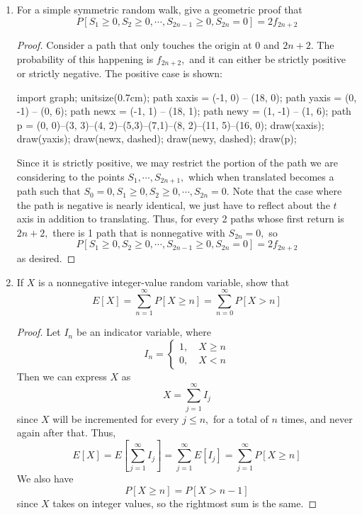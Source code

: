 \documentclass{article}
\begin{document}
\begin{enumerate}
	\item For a simple symmetric random walk, give a geometric proof that 
		\[P[S_1\ge 0, S_2\ge 0, \cdots, S_{2n-1}\ge 0, S_{2n}=0] = 2f_{2n+2}\]
		\begin{proof}
			Consider a path that only touches the origin at 0 and $2n+2.$ The probability of this happening is $f_{2n+2},$ and it can either be strictly positive or strictly negative. The positive case is shown:
			\begin{center}
				\begin{asy}
					import graph;
					unitsize(0.7cm);
					path xaxis = (-1, 0) -- (18, 0);
					path yaxis = (0, -1) -- (0, 6);
					path newx = (-1, 1) -- (18, 1);
					path newy = (1, -1) -- (1, 6);
					path p = (0, 0)--(3, 3)--(4, 2)--(5,3)--(7,1)--(8, 2)--(11, 5)--(16, 0);
					draw(xaxis);
					draw(yaxis);
					draw(newx, dashed);
					draw(newy, dashed);
					draw(p);
				\end{asy}
			\end{center}
			Since it is strictly positive, we may restrict the portion of the path we are considering to the points $S_1, \cdots, S_{2n+1},$ which when translated becomes a path such that $S_0= 0, S_1\ge 0, S_2\ge 0, \cdots, S_{2n}=0.$ Note that the case where the path is negative is nearly identical, we just have to reflect about the $t$ axis in addition to translating. Thus, for every 2 paths whose first return is $2n+2,$ there is 1 path that is nonnegative with $S_{2n}=0,$ so 
			\[P[S_1\ge 0, S_2\ge 0, \cdots, S_{2n-1}\ge 0, S_{2n}=0] = 2f_{2n+2}\]
			as desired.
		\end{proof}

	\item If $X$ is a nonnegative integer-value random variable, show that
		\[E[X] = \sum_{n=1}^{\infty} P[X\ge n] = \sum_{n=0}^{\infty}P[X>n]\]
		\begin{proof}
			Let $I_n$ be an indicator variable, where
			\[I_n=\begin{cases}
					1, \quad X\ge n \\
					0, \quad X < n
			\end{cases}\]
			Then we can express $X$ as
			\[X=\sum_{j=1}^{\infty} I_j\]
			since $X$ will be incremented for every $j\le n,$ for a total of $n$ times, and never again after that. Thus,
			\[E[X] = E\left[ \sum_{j=1}^{\infty}I_j \right] = \sum_{j=1}^{\infty}E[I_j] = \sum_{j=1}^{\infty}P[X\ge n]\]
			We also have
			\[P[X\ge n] = P[X>n-1]\]
			since $X$ takes on integer values, so the rightmost sum is the same.
		\end{proof}
		
\end{enumerate}
\end{document}

